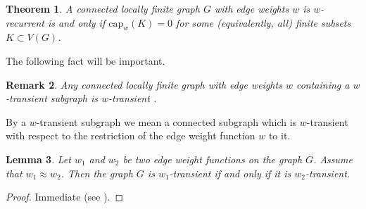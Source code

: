 \documentclass{amsart}
\newcommand{\NN}{\mathbb{N}}
\newcommand{\capacity}[2][]{\mathrm{cap}_{#1}\left(#2\right)}
\theoremstyle{plain}
\newtheorem{theorem}{Theorem}[section]
\newtheorem{lemma}[theorem]{Lemma}
\newtheorem{remark}[theorem]{Remark}
\numberwithin{equation}{section}
\theoremstyle{definition}
\begin{document}
\begin{theorem}
\label{theorem:capacity for graphs}
A connected locally finite graph $G$ with edge weights $w$ is $w$-recurrent is and only if $\capacity[w]{K} = 0$ for some (equivalently, all) finite subsets $K \subset V(G)$.
\end{theorem}

The following fact will be important.

\begin{remark}
\label{remark:transient subgraph}
Any connected locally finite graph with edge weights $w$ containing a $w$-transient subgraph is $w$-transient \cite[Corollary 2.15]{woess2000random}. 
\end{remark}

By a $w$-transient subgraph we mean a connected subgraph which is $w$-transient with respect to the restriction of the edge weight function $w$ to it.

\begin{lemma}
\label{lemma:bounded w}
Let $w_1$ and $w_2$ be two edge weight functions on the graph $G$. Assume that $w_1 \approx w_2$. Then the graph $G$ is $w_1$-transient if and only if it is $w_2$-transient.
\end{lemma}
\begin{proof}
Immediate (see \cite[Corollary 2.14]{woess2000random}).
\end{proof}




\end{document}
